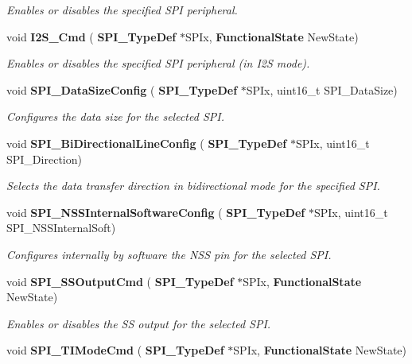 \begin{DoxyCompactItemize}
\begin{DoxyCompactList}\small\item\em Enables or disables the specified S\+PI peripheral. \end{DoxyCompactList}\item 
void \textbf{ I2\+S\+\_\+\+Cmd} (\textbf{ S\+P\+I\+\_\+\+Type\+Def} $\ast$S\+P\+Ix, \textbf{ Functional\+State} New\+State)
\begin{DoxyCompactList}\small\item\em Enables or disables the specified S\+PI peripheral (in I2S mode). \end{DoxyCompactList}\item 
void \textbf{ S\+P\+I\+\_\+\+Data\+Size\+Config} (\textbf{ S\+P\+I\+\_\+\+Type\+Def} $\ast$S\+P\+Ix, uint16\+\_\+t S\+P\+I\+\_\+\+Data\+Size)
\begin{DoxyCompactList}\small\item\em Configures the data size for the selected S\+PI. \end{DoxyCompactList}\item 
void \textbf{ S\+P\+I\+\_\+\+Bi\+Directional\+Line\+Config} (\textbf{ S\+P\+I\+\_\+\+Type\+Def} $\ast$S\+P\+Ix, uint16\+\_\+t S\+P\+I\+\_\+\+Direction)
\begin{DoxyCompactList}\small\item\em Selects the data transfer direction in bidirectional mode for the specified S\+PI. \end{DoxyCompactList}\item 
void \textbf{ S\+P\+I\+\_\+\+N\+S\+S\+Internal\+Software\+Config} (\textbf{ S\+P\+I\+\_\+\+Type\+Def} $\ast$S\+P\+Ix, uint16\+\_\+t S\+P\+I\+\_\+\+N\+S\+S\+Internal\+Soft)
\begin{DoxyCompactList}\small\item\em Configures internally by software the N\+SS pin for the selected S\+PI. \end{DoxyCompactList}\item 
void \textbf{ S\+P\+I\+\_\+\+S\+S\+Output\+Cmd} (\textbf{ S\+P\+I\+\_\+\+Type\+Def} $\ast$S\+P\+Ix, \textbf{ Functional\+State} New\+State)
\begin{DoxyCompactList}\small\item\em Enables or disables the SS output for the selected S\+PI. \end{DoxyCompactList}\item 
void \textbf{ S\+P\+I\+\_\+\+T\+I\+Mode\+Cmd} (\textbf{ S\+P\+I\+\_\+\+Type\+Def} $\ast$S\+P\+Ix, \textbf{ Functional\+State} New\+State)

\end{DoxyCompactItemize}
